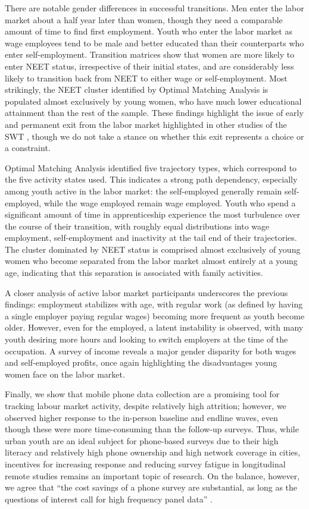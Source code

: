 \documentclass[
  a4paper, twoside, 12pt]{book}
\begin{document}
There are notable gender differences in successful transitions. Men enter the labor market about a half year later than women, though they need a comparable amount of time to find first employment. Youth who enter the labor market as wage employees tend to be male and better educated than their counterparts who enter self-employment. Transition matrices show that women are more likely to enter NEET status, irrespective of their initial states, and are considerably less likely to transition back from NEET to either wage or self-employment. Most strikingly, the NEET cluster identified by Optimal Matching Analysis is populated almost exclusively by young women, who have much lower educational attainment than the rest of the sample. These findings highlight the issue of early and permanent exit from the labor market highlighted in other studies of the SWT \autocite{manacorda2017,dedehouanou2019}, though we do not take a stance on whether this exit represents a choice or a constraint.

Optimal Matching Analysis identified five trajectory types, which correspond to the five activity states used. This indicates a strong path dependency, especially among youth active in the labor market: the self-employed generally remain self-employed, while the wage employed remain wage employed. Youth who spend a significant amount of time in apprenticeship experience the most turbulence over the course of their transition, with roughly equal distributions into wage employment, self-employment and inactivity at the tail end of their trajectories. The cluster dominated by NEET status is comprised almost exclusively of young women who become separated from the labor market almost entirely at a young age, indicating that this separation is associated with family activities.

A closer analysis of active labor market participants underscores the previous findings: employment stabilizes with age, with regular work (as defined by having a single employer paying regular wages) becoming more frequent as youth become older. However, even for the employed, a latent instability is observed, with many youth desiring more hours and looking to switch employers at the time of the occupation. A survey of income reveals a major gender disparity for both wages and self-employed profits, once again highlighting the disadvantages young women face on the labor market.

Finally, we show that mobile phone data collection are a promising tool for tracking labour market activity, despite relatively high attrition; however, we observed higher response to the in-person baseline and endline waves, even though these were more time-consuming than the follow-up surveys. Thus, while urban youth are an ideal subject for phone-based surveys due to their high literacy and relatively high phone ownership and high network coverage in cities, incentives for increasing response and reducing survey fatigue in longitudinal remote studies remains an important topic of research. On the balance, however, we agree that ``the cost savings of a phone survey are substantial, as long as the questions of interest call for high frequency panel data'' \autocite{dillon2012}.
\end{document}
